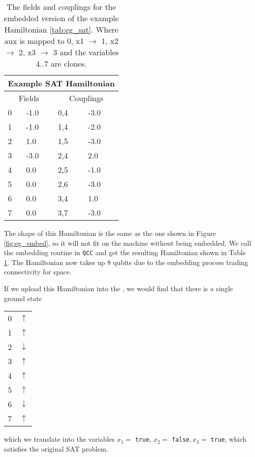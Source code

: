 \begin{table}
	\begin{center}
\begin{tabular}{ | l | l | l | l |}
	\hline
	\multicolumn{4}{|c|}{Example SAT Hamiltonian} \\ \hline
	\multicolumn{2}{|c|}{Fields} & \multicolumn{2}{c|}{Couplings} \\ \hline
	0 & -1.0 & 0,4 & -3.0 \\
	1 & -1.0 & 1,4 & -2.0 \\
	2 & 1.0 & 1,5 & -3.0 \\
	3 & -3.0 & 2,4 & 2.0 \\ 
	4 & 0.0 & 2,5 & -1.0 \\
	5 & 0.0 & 2,6 & -3.0 \\
	6 & 0.0 & 3,4 & 1.0 \\
	7 & 0.0 & 3,7 & -3.0 \\ \hline
\end{tabular}
\end{center}
\caption[Example embedded SAT Hamiltonian]{The fields and couplings for the embedded version of the example Hamiltonian \ref{tab:eg_sat}. Where aux is mapped to 0, x1 $\rightarrow$ 1, x2 $\rightarrow$ 2, x3 $\rightarrow$ 3 and the variables 4..7 are clones.}
\label{tab:eg_sat_full}
\end{table}


The shape of this Hamiltonian is the same as the one shown in Figure \ref{fig:eg_embed}, so it will not fit on the machine without being embedded.  We call the embedding routine in \texttt{QCC} and get the resulting Hamiltonian shown in Table \ref{tab:eg_sat_full}.  The Hamiltonian now takes up 8 qubits due to the embedding process trading connectivity for space.

If we upload this Hamiltonian into the \machine, we would find that there is a single ground state
\begin{center}
\begin{tabular}{l l}
	0 & $\uparrow$ \\
	1 & $\uparrow$ \\
	2 & $\downarrow$ \\
	3 & $\uparrow$ \\
	4 & $\uparrow$ \\
	5 & $\uparrow$ \\
	6 & $\downarrow$ \\
	7 & $\uparrow$ \\
\end{tabular}
\end{center}

which we translate into the variables $x_1 =$ \texttt{true}, $x_2 =$ \texttt{false}$, x_3 =$ \texttt{true}, which satisfies the original SAT problem.
